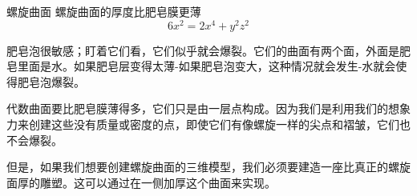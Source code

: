 ﻿\begin{surferPage}{螺旋曲面}
螺旋曲面的厚度比肥皂膜更薄\\
  \smallskip
\[6x^2	= 2x^4	+ y^2	z^2\]

\singlespacing


肥皂泡很敏感；盯着它们看，它们似乎就会爆裂。它们的曲面有两个面，外面是肥皂里面是水。如果肥皂层变得太薄-如果肥皂泡变大，这种情况就会发生-水就会使得肥皂泡爆裂。\\

\vspace{0,3cm}

代数曲面要比肥皂膜薄得多，它们只是由一层点构成。因为我们是利用我们的想象力来创建这些没有质量或密度的点，即使它们有像螺旋一样的尖点和褶皱，它们也不会爆裂。\\

\vspace{0,3cm}

但是，如果我们想要创建螺旋曲面的三维模型，我们必须要建造一座比真正的螺旋面厚的雕塑。这可以通过在一侧加厚这个曲面来实现。
\end{surferPage}

